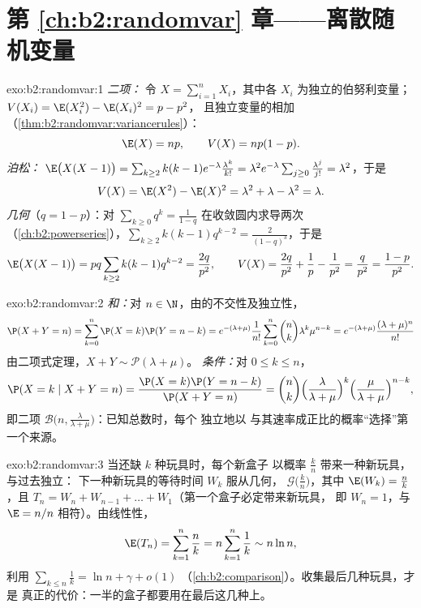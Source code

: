 \section*{第 \ref{ch:b2:randomvar} 章——离散随机变量}

\begin{solution}{exo:b2:randomvar:1}
\emph{二项：} 令 $X = \sum_{i=1}^n X_i$，其中各
$X_i$ 为独立的伯努利变量；$V(X_i) = \E(X_i^2) - \E(X_i)^2 = p - p^2$，
且独立变量的相加
（\cref{thm:b2:randomvar:variancerules}）：
\[
\E(X) = np, \qquad V(X) = np(1-p) .
\]
\emph{泊松：} $\E\bigl(X(X-1)\bigr) =
\sum_{k\geq2}k(k-1)e^{-\lambda}\frac{\lambda^k}{k!} = \lambda^2
e^{-\lambda}\sum_{j\geq0}\frac{\lambda^j}{j!} = \lambda^2$，于是
\[
V(X) = \E(X^2) - \E(X)^2
= \lambda^2 + \lambda - \lambda^2 = \lambda .
\]
\emph{几何}（$q = 1 - p$）：对
$\sum_{k\geq0}q^k = \frac{1}{1-q}$ 在收敛圆内求导两次
（\cref{ch:b2:powerseries}），$\sum_{k\geq2}k(k-1)q^{k-2} =
\frac{2}{(1-q)^3}$，于是
\[
\E\bigl(X(X-1)\bigr) = pq\sum_{k\geq2}k(k-1)q^{k-2}
= \frac{2q}{p^2},
\qquad
V(X) = \frac{2q}{p^2} + \frac1p - \frac{1}{p^2}
= \frac{q}{p^2} = \frac{1-p}{p^2} .
\]
\end{solution}

\begin{solution}{exo:b2:randomvar:2}
\emph{和：}对 $n \in \N$，由的不交性及独立性，
\[
\P(X + Y = n)
= \sum_{k=0}^n \P(X = k)\P(Y = n - k)
= e^{-(\lambda + \mu)}\frac{1}{n!}
\sum_{k=0}^n \binom nk \lambda^k\mu^{n-k}
= e^{-(\lambda+\mu)}\frac{(\lambda + \mu)^n}{n!}
\]
由二项式定理，$X + Y \sim \mathcal{P}(\lambda + \mu)$。
\emph{条件：}对 $0 \leq k \leq n$，
\[
\P(X = k \mid X + Y = n)
= \frac{\P(X = k)\P(Y = n - k)}{\P(X + Y = n)}
= \binom nk
\Bigl(\frac{\lambda}{\lambda+\mu}\Bigr)^{k}
\Bigl(\frac{\mu}{\lambda+\mu}\Bigr)^{n-k} ,
\]
即二项 $\mathcal{B}\bigl(n,
\frac{\lambda}{\lambda+\mu}\bigr)$：已知总数时，每个
独立地以
与其速率成正比的概率“选择”第一个来源。
\end{solution}

\begin{solution}{exo:b2:randomvar:3}
当还缺 $k$ 种玩具时，每个新盒子
以概率 $\frac kn$ 带来一种新玩具，与过去独立：
下一种新玩具的等待时间 $W_k$ 服从几何，
$\mathcal{G}\bigl(\frac kn\bigr)$，其中 $\E(W_k) = \frac nk$，且
$T_n = W_n + W_{n-1} + \dots + W_1$（第一个盒子必定带来新玩具，
即 $W_n = 1$，与 $\E = n/n$ 相符）。由线性性，
\[
\E(T_n) = \sum_{k=1}^n \frac nk = n\sum_{k=1}^n\frac1k
\sim n\ln n ,
\]
利用 $\sum_{k\leq n}\frac1k = \ln n + \gamma + o(1)$
（\cref{ch:b2:comparison}）。收集最后几种玩具，才是
真正的代价：一半的盒子都要用在最后这几种上。
\end{solution}

